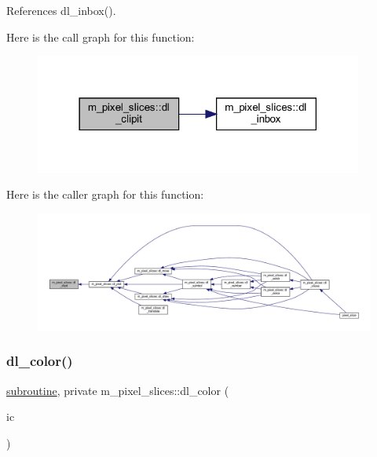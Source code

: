 References dl\+\_\+inbox().

Here is the call graph for this function\+:
\nopagebreak
\begin{figure}[H]
\begin{center}
\leavevmode
\includegraphics[width=306pt]{namespacem__pixel__slices_af0a3aeaa17e192568cb6a69a3b3eeab6_cgraph}
\end{center}
\end{figure}
Here is the caller graph for this function\+:
\nopagebreak
\begin{figure}[H]
\begin{center}
\leavevmode
\includegraphics[width=350pt]{namespacem__pixel__slices_af0a3aeaa17e192568cb6a69a3b3eeab6_icgraph}
\end{center}
\end{figure}
\mbox{\label{namespacem__pixel__slices_a8e362bf8eea80faddc97f7d137c95f9c}} 
\subsubsection{\texorpdfstring{dl\+\_\+color()}{dl\_color()}}
{\footnotesize\ttfamily \hyperlink{M__stopwatch_83_8txt_acfbcff50169d691ff02d4a123ed70482}{subroutine}, private m\+\_\+pixel\+\_\+slices\+::dl\+\_\+color (\begin{DoxyParamCaption}\item[{}]{ic }\end{DoxyParamCaption})\hspace{0.3cm}{\ttfamily [private]}}



